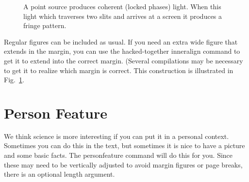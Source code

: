 \begin{figure}[b]
    \caption{\label{fig:8.6} A point source produces coherent
    (locked phases) light.  When this light which traverses two
   slits and arrives at a screen it produces a fringe pattern.
    }
\end{figure}


Regular figures can be included as usual.  If you need an extra
wide figure that extends in the margin, you can use the
hacked-together inneralign command to get it to extend into the
correct margin.  (Several compilations may be necessary to get it
to realize which margin is correct.  This construction is
illustrated in Fig.~\ref{fig:8.6}.



\section{Person Feature}

We think science is more interesting if you can put it in a
personal context.  Sometimes you can do this in the text, but
sometimes it is nice to have a picture and some basic facts.  The
personfeature command will do this for you.  Since these may need
to be vertically adjusted to avoid margin figures or page breaks,
there is an optional length argument.




